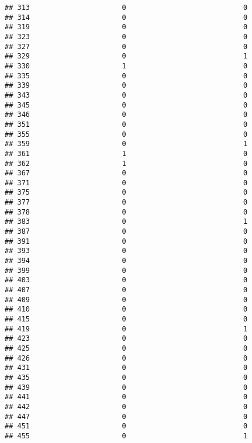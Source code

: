 \documentclass[
]{article}
\begin{document}
\begin{verbatim}
## 313                      0                            0
## 314                      0                            0
## 319                      0                            0
## 323                      0                            0
## 327                      0                            0
## 329                      0                            1
## 330                      1                            0
## 335                      0                            0
## 339                      0                            0
## 343                      0                            0
## 345                      0                            0
## 346                      0                            0
## 351                      0                            0
## 355                      0                            0
## 359                      0                            1
## 361                      1                            0
## 362                      1                            0
## 367                      0                            0
## 371                      0                            0
## 375                      0                            0
## 377                      0                            0
## 378                      0                            0
## 383                      0                            1
## 387                      0                            0
## 391                      0                            0
## 393                      0                            0
## 394                      0                            0
## 399                      0                            0
## 403                      0                            0
## 407                      0                            0
## 409                      0                            0
## 410                      0                            0
## 415                      0                            0
## 419                      0                            1
## 423                      0                            0
## 425                      0                            0
## 426                      0                            0
## 431                      0                            0
## 435                      0                            0
## 439                      0                            0
## 441                      0                            0
## 442                      0                            0
## 447                      0                            0
## 451                      0                            0
## 455                      0                            1

\end{verbatim}
\end{document}

